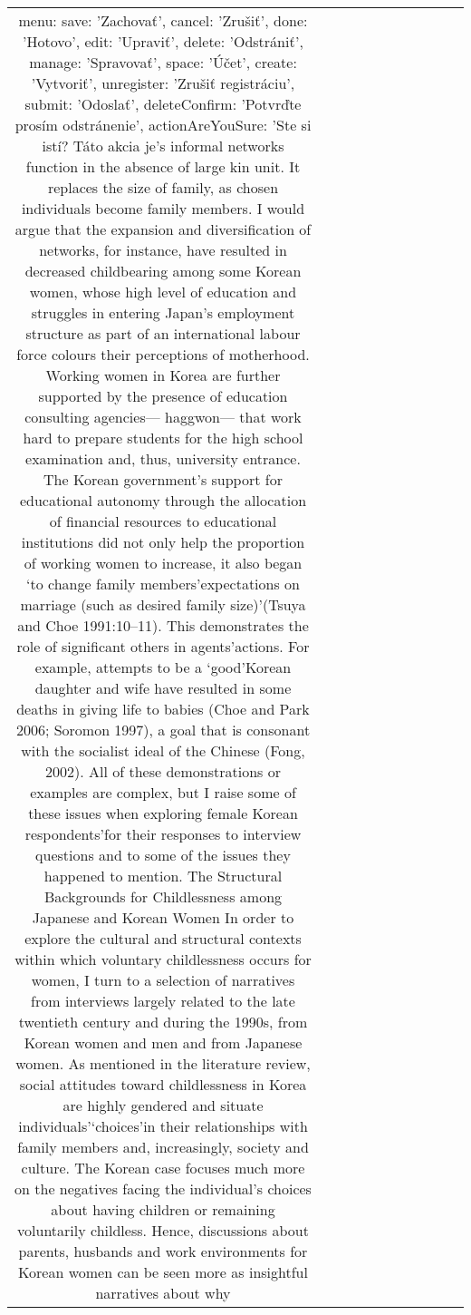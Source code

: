 \begin{table}[h!]
\begin{tabular}{|c|c|c|c|c|c|c|c|c|c|c|}
  menu: {
    save: 'Zachovať',
    cancel: 'Zrušiť',
    done: 'Hotovo',
    edit: 'Upraviť',
    delete: 'Odstrániť',
    manage: 'Spravovať',
    space: 'Účet',
    create: 'Vytvoriť',
    unregister: 'Zrušiť registráciu',
    submit: 'Odoslať',
    deleteConfirm: 'Potvrďte prosím odstránenie',
    actionAreYouSure: 'Ste si istí? Táto akcia je’s informal networks function in the absence of large kin unit. It replaces the size of family, as chosen individuals become family members.
I would argue that the expansion and diversification of networks, for instance, have resulted in decreased childbearing among some Korean women, whose high level of education and struggles in entering Japan’s employment structure as part of an international labour force colours their perceptions of motherhood. Working women in Korea are further supported by the presence of education consulting agencies— haggwon— that work hard to prepare students for the high school examination and, thus, university entrance. The Korean government’s support for educational autonomy through the allocation of financial resources to educational institutions did not only help the proportion of working women to increase, it also began ‘to
change family members’expectations on marriage (such as desired family size)’(Tsuya and Choe 1991:10–11).
This demonstrates the role of significant others in agents’actions. For example, attempts to be a ‘good’Korean daughter and wife have resulted in some deaths in giving life to babies (Choe and Park 2006; Soromon 1997), a goal that is consonant with the socialist ideal of the Chinese (Fong, 2002).
All of these demonstrations or examples are complex, but I raise some of these issues when exploring female Korean respondents’for their responses to interview questions and to some of the issues they happened to mention.
The Structural Backgrounds for Childlessness among Japanese and Korean Women
In order to explore the cultural and structural contexts within which voluntary childlessness occurs for women, I turn to a selection of narratives from interviews largely related to the late twentieth century and during the 1990s, from Korean women and men and from Japanese women.
As mentioned in the literature review, social attitudes toward childlessness in Korea are highly gendered and situate individuals’‘choices’in their relationships with family members and, increasingly, society and culture. The Korean case focuses much more on the negatives facing the individual’s choices about having children or remaining voluntarily childless. Hence, discussions about parents, husbands and work environments for Korean women can be seen more as insightful narratives about why
}
\end{tabular}
\end{table}
